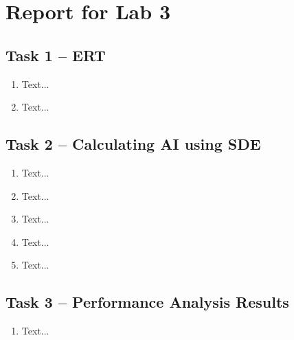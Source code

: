 \documentclass[a4paper, DIV12, headsepline]{scrartcl}
\begin{document}
\section*{Report for Lab 3}
\subsection*{Task 1 -- ERT}
\begin{enumerate}[label=\alph*)]
\item Text...
\item Text...
\end{enumerate}

\subsection*{Task 2 -- Calculating AI using SDE}
\begin{enumerate}[label=\alph*)]
\item Text...
\item Text...
\item Text...
\item Text...
\item Text...
\end{enumerate}

\subsection*{Task 3 -- Performance Analysis Results}
\begin{enumerate}[label=\alph*)]
\item Text...
\end{enumerate}
\end{document}
